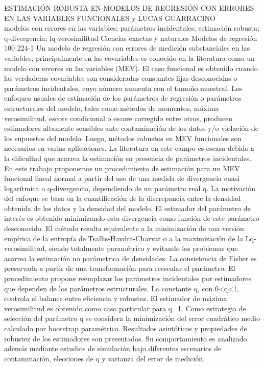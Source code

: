 \A
{ESTIMACIÓN ROBUSTA EN MODELOS DE REGRESIÓN CON ERRORES EN LAS VARIABLES FUNCIONALES}
{ y LUCAS GUARRACINO}
{
\\}
{modelos con errores en las variables; parámetros incidentales; estimación robusta; q-divergencia; lq-verosimilitud} 
 {Ciencias exactas y naturales} 
 {Modelos de regresión} 
 {100} 
 {224-1}
{Un modelo de regresión con errores de medición substanciales en las variables, principalmente en las covariables es conocido en la literatura como un modelo con errores en las variables (MEV). El caso funcional es obtenido cuando las verdaderas covariables son consideradas constantes fijas desconocidas o parámetros incidentales, cuyo número aumenta con el tamaño muestral. Los enfoques usuales de estimación de los parámetros de regresión o parámetros estructurales del modelo, tales como métodos de momentos, máxima verosimilitud, escore condicional o escore corregido entre otros, producen estimadores altamente sensibles ante contaminación de los datos y/o violación de los supuestos del modelo. Luego, métodos robustos en MEV funcionales son necesarios en varias aplicaciones. La literatura en este campo es escasa debido a la dificultad que acarrea la estimación en presencia de parámetros incidentales. En este trabajo proponemos un procedimiento de estimación para un MEV funcional lineal normal a partir del uso de una medida de divergencia cuasi logarítmica o q-divergencia, dependiendo de un parámetro real q. La motivación del enfoque se basa en la cuantificación de la discrepancia entre la densidad obtenida de los datos y la densidad del modelo. El estimador del parámetro de interés es obtenido minimizando esta divergencia como función de este parámetro desconocido. El método resulta equivalente a la minimización de una versión empírica de la entropía de Tsallis-Havdra-Charvat o a la maximización de la Lq-verosimilitud, siendo totalmente paramétrico y evitando los problemas que acarrea la estimación no parámetrica de densidades. La consistencia de Fisher es preservada a partir de una transformación para reescalar el parámetro. El procedimiento propone reemplazar los parámetros incidentales por estimadores que dependen de los parámetros estructurales. La constante q, con 0<q<1, controla el balance entre eficiencia y robustez. El estimador de máxima verosimilitud es obtenido como caso particular para q=1. Como estrategia de selección del parámetro q se considera la minimización del error cuadrático medio calculado por bootstrap paramétrico. Resultados asintóticos y propiedades de robustez de los estimadores son presentados. Su comportamiento es analizado además mediante estudios de simulación bajo diferentes escenarios de contaminación, elecciones de q y varianza del error de medición.}
